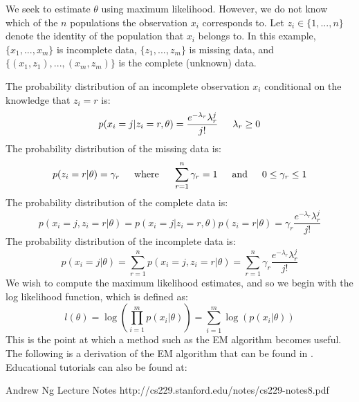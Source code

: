 \documentclass[letter,12pt]{article}
\begin{document}
We seek to estimate $\theta$ using maximum likelihood.  However, we do not know which of the $n$ populations the observation $x_i$ corresponds to.  Let $z_i \in \{1,...,n\}$ denote the identity of the population that $x_i$ belongs to.  In this example, $\{x_1,...,x_m\}$ is incomplete data, $\{z_1,...,z_m\}$ is missing data, and $\{(x_1,z_1),...,(x_m,z_m)\}$ is the complete (unknown) data.

The probability distribution of an incomplete observation $x_i$ conditional on the knowledge that $z_i=r$ is:
\[
p(x_i=j|z_i=r,\theta) = \frac{e^{-\lambda_r}\lambda_r^{j}}{j!}  
\indent
\lambda_r \geq 0
\]
The probability distribution of the missing data is:
\[
p(z_i=r|\theta) = \gamma_r
\indent
\text{where}
\indent 
\sum_{r=1}^{n}\gamma_r = 1
\indent
\text{and}
\indent 
0 \leq \gamma_r \leq 1
\]
The probability distribution of the complete data is:
\begin{equation} \label{eq_constraint}
p(x_i=j,z_i=r|\theta) 
= p(x_i=j|z_i=r,\theta)p(z_i=r|\theta) = \gamma_r\frac{e^{-\lambda_r}\lambda_r^{j}}{j!}
\end{equation}
The probability distribution of the incomplete data is:
\[
p(x_i=j|\theta) 
= \sum_{r=1}^{n} p(x_i=j,z_i=r|\theta)  = \sum_{r=1}^{n}\gamma_r\frac{e^{-\lambda_r}\lambda_r^{j}}{j!}
\]
We wish to compute the maximum likelihood estimates, and so we begin with the log likelihood function, which is defined as:
\[
l(\theta) = \log(\prod_{i=1}^{m}p(x_i|\theta)) = \sum_{i=1}^{m} \log(p(x_i|\theta))
\]
This is the point at which a method such as the EM algorithm becomes useful.  The following is a derivation of the EM algorithm that can be found in \cite{McLachlanKrishnanEM}.  Educational tutorials can also be found at:
\begin{list}{-}{}
\item Andrew Ng Lecture Notes  http://cs229.stanford.edu/notes/cs229-notes8.pdf
\item \cite{gentletutorial}
\end{list}
\end{document}
